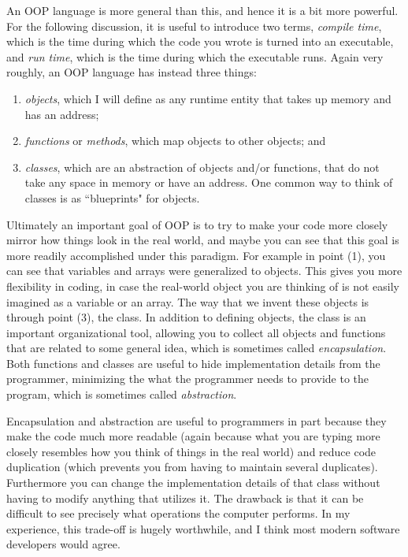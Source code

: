 An OOP language is more general than this, and hence it is a bit more powerful.
For the following discussion, it is useful to introduce two terms,
{\it compile time}, which is the time during which the code you wrote
is turned into an executable, and {\it run time}, which is the time during
which the executable runs.
Again very roughly, an OOP language has instead three things:
\begin{enumerate}
  \item {\it objects}, which I will define as any runtime entity that 
        takes up memory and has an address;
  \item {\it functions} or {\it methods}, which map objects to other
        objects; and
  \item {\it classes}, which are an abstraction of objects and/or functions,
        that do not take any space in memory or have an address. One common
        way to think of classes is as ``blueprints" for objects.
\end{enumerate}

Ultimately an important goal of OOP is to try to make your code more closely
mirror how things look in the real world, and maybe you can see that this
goal is more readily accomplished under this paradigm.
For example in point (1), you can see that variables
and arrays were generalized to objects. This gives you more flexibility in
coding, in case the real-world object you are thinking of is not easily
imagined as a variable or an array. The way that we invent these objects
is through point (3), the class. In addition to defining objects, the
class is an important organizational tool, allowing you to collect all
objects and functions that are related to some general idea,
which is sometimes called 
{\it encapsulation}. Both functions and classes
are useful to hide implementation details from the programmer, minimizing
the what the programmer needs to provide to the program, which is
sometimes called {\it abstraction}.

Encapsulation and abstraction are useful to programmers in part because
they make the code much more readable (again because what you are typing
more closely resembles how you think of things in the real world) and
reduce code duplication (which prevents you from having to maintain
several duplicates). Furthermore you
can change the implementation details of that class
without having to modify anything that utilizes it. The drawback is that
it can be difficult to see precisely what operations the computer
performs. In my experience, this trade-off is hugely worthwhile, and I think
most modern software developers would agree.


